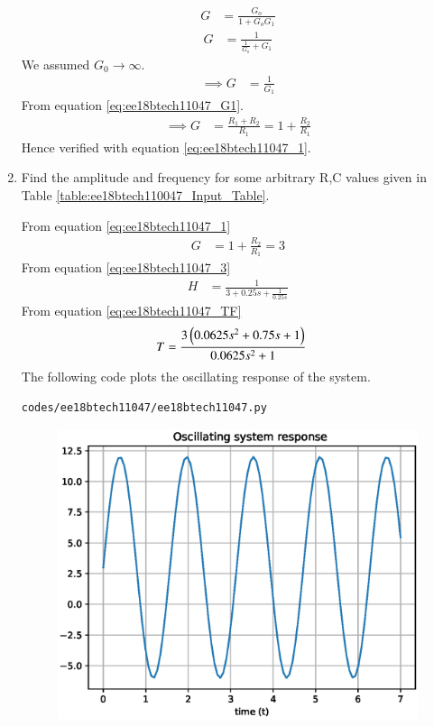 \begin{enumerate}[label=\arabic*.,ref=\theenumi]
\begin{align}
G &= \frac{G_{o}}{1+G_{o}G_{1}}
\end{align}
\begin{align}
G  &= \frac{1}{\frac{1}{G_{o}} + G_{1}}
\end{align}
We assumed $G_{0}\to\infty$. 
\begin{align}
\implies G&=\frac{1}{G_{1}}
\end{align}
From equation \eqref{eq:ee18btech11047_G1}.
\begin{align}
\implies G &= \frac{R_{1}+R_{2}}{R_{1}}=1+\frac{R_{2}}{R_{1}}
\end{align}
Hence verified with equation \eqref{eq:ee18btech11047_1}.
\item Find the amplitude and frequency for some arbitrary R,C values given in Table \ref{table:ee18btech110047_Input_Table}.\\
\begin{table}[!ht]
\centering

\caption{}
\label{table:ee18btech110047_Input_Table}
\end{table}
\solution From equation \eqref{eq:ee18btech11047_1} 
\begin{align}
G &= 1 + \frac{R_{2}}{R_{1}} = 3
\end{align}
From equation \eqref{eq:ee18btech11047_3}
\begin{align}
H &= \frac{1}{3 + 0.25s + \frac{1}{0.25s}}
\end{align}
From equation \eqref{eq:ee18btech11047_TF}
\begin{align}
T &= \frac{3\left(0.0625s^{2} + 0.75s + 1\right)}{0.0625s^{2} + 1}
\end{align}
The following code plots the oscillating response of the system.
\begin{lstlisting}
codes/ee18btech11047/ee18btech11047.py
\end{lstlisting}
\begin{figure}[!ht]
\centering
\includegraphics[width=\columnwidth]{./figs/ee18btech11047/ee18btech11047.eps}

\end{figure}
\end{enumerate}
